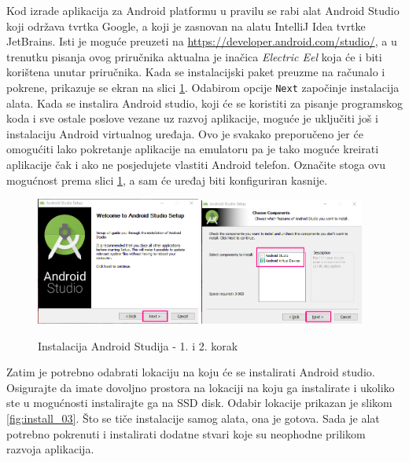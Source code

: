 \documentclass[11pt,a4paper,twoside]{article}
\begin{document}
	Kod izrade aplikacija za Android platformu u pravilu se rabi alat Android Studio koji održava tvrtka Google, a koji je zasnovan na alatu IntelliJ Idea tvrtke JetBrains. Isti je moguće preuzeti na \url{https://developer.android.com/studio/}, a u trenutku pisanja ovog priručnika aktualna je inačica \textit{Electric Eel} koja će i biti korištena unutar priručnika. Kada se instalacijski paket preuzme na računalo i pokrene, prikazuje se ekran na slici \ref{fig:install_01}. Odabirom opcije \texttt{Next} započinje instalacija alata. 	Kada se instalira Android studio, koji će se koristiti za pisanje programskog koda i sve ostale poslove vezane uz razvoj aplikacije, moguće je uključiti još i instalaciju Android virtualnog uređaja. Ovo je svakako preporučeno jer će omogućiti lako pokretanje aplikacije na emulatoru pa je tako moguće kreirati aplikacije čak i ako ne posjedujete vlastiti Android telefon. Označite stoga ovu mogućnost prema slici \ref{fig:install_01}, a sam će uređaj biti konfiguriran kasnije.

	\begin{figure}[!h]
		\centering
		\includegraphics[width=0.48\textwidth]{install_01.png}
		\hfill
		\includegraphics[width=0.48\textwidth]{install_02.png}
		\caption{Instalacija Android Studija - 1. i 2. korak}
		\label{fig:install_01}	
	\end{figure}

	Zatim je potrebno odabrati lokaciju na koju će se instalirati Android studio. Osigurajte da imate dovoljno prostora na lokaciji na koju ga instalirate i ukoliko ste u mogućnosti instalirajte ga na SSD disk. Odabir lokacije prikazan je slikom \ref{fig:install_03}. Što se tiče instalacije samog alata, ona je gotova. Sada je alat potrebno pokrenuti i instalirati dodatne stvari koje su neophodne prilikom razvoja aplikacija. 
\end{document}
